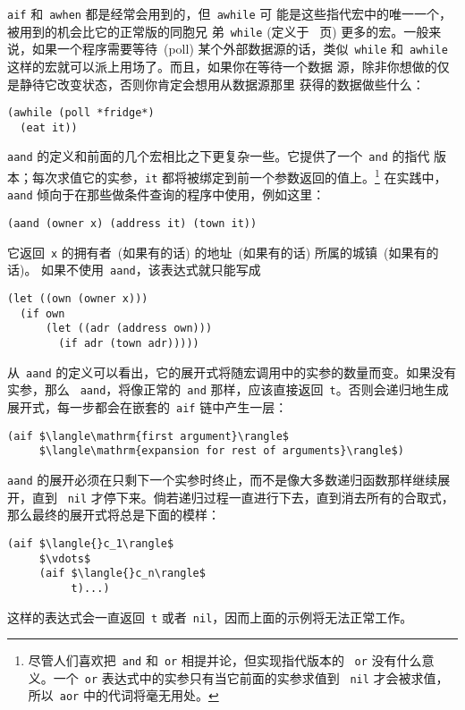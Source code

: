\verb|aif| 和~\verb|awhen| 都是经常会用到的，但~\verb|awhile| 可
能是这些指代宏中的唯一一个，被用到的机会比它的正常版的同胞兄
弟~\verb|while| (定义于~\pageref{macro:while} 页) 更多的宏。一般来
说，如果一个程序需要等待~(poll) 某个外部数据源的话，类似~\verb|while|
和~\verb|awhile| 这样的宏就可以派上用场了。而且，如果你在等待一个数据
源，除非你想做的仅是静待它改变状态，否则你肯定会想用从数据源那里
获得的数据做些什么：
\begin{lstlisting}
(awhile (poll *fridge*)
  (eat it))
\end{lstlisting}

\verb|aand| 的定义和前面的几个宏相比之下更复杂一些。它提供了一个~\verb|and| 的指代
版本；每次求值它的实参，\verb|it| 都将被绑定到前一个参数返回的值上。\footnote{
尽管人们喜欢把~\texttt{and} 和~\texttt{or} 相提并论，但实现指代版本的
~\texttt{or} 没有什么意义。一个~\texttt{or} 表达式中的实参只有当它前面的实参求值到
~\texttt{nil} 才会被求值，所以~\texttt{aor} 中的代词将毫无用处。}
在实践中，\texttt{aand} 倾向于在那些做条件查询的程序中使用，例如这里：
\begin{lstlisting}
(aand (owner x) (address it) (town it))
\end{lstlisting}
它返回~\texttt{x} 的拥有者~(如果有的话) 的地址~(如果有的话) 所属的城镇~(如果有的话)。
如果不使用~\texttt{aand}，该表达式就只能写成
\begin{lstlisting}
(let ((own (owner x)))
  (if own
      (let ((adr (address own)))
        (if adr (town adr)))))
\end{lstlisting}

从~\verb|aand| 的定义可以看出，它的展开式将随宏调用中的实参的数量而变。如果没有实参，那么
~\verb|aand|，将像正常的~\verb|and| 那样，应该直接返回~\verb|t|。否则会递归地生成
展开式，每一步都会在嵌套的~\verb|aif| 链中产生一层：
\begin{lstlisting}
(aif $\langle\mathrm{first argument}\rangle$
     $\langle\mathrm{expansion for rest of arguments}\rangle$)
\end{lstlisting}
\verb|aand| 的展开必须在只剩下一个实参时终止，而不是像大多数递归函数那样继续展开，直到
~\verb|nil| 才停下来。倘若递归过程一直进行下去，直到消去所有的合取式，那么最终的展开式将总是下面的模样：
\begin{lstlisting}
(aif $\langle{}c_1\rangle$
     $\vdots$
     (aif $\langle{}c_n\rangle$
          t)...)
\end{lstlisting}
这样的表达式会一直返回~\verb|t| 或者~\verb|nil|，因而上面的示例将无法正常工作。

